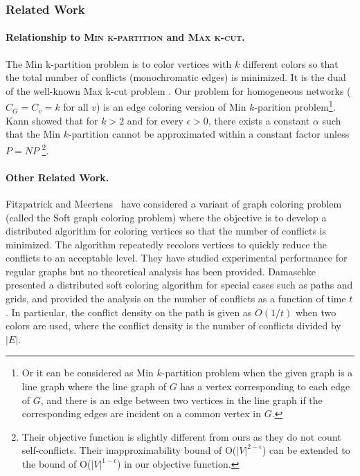 \documentclass[titlepage, 11pt]{article}
\begin{document}
\subsubsection{Related Work} 
\paragraph{Relationship to \textsc{Min k-partition} and \textsc{Max k-cut}.} 
The {\sc Min k-partition} problem is 
to color vertices with $k$ different colors
so that the total number of conflicts (monochromatic edges) is minimized.
It is the dual of the well-known {\sc Max k-cut} problem \cite{kann:istcs}.
Our problem for homogeneous networks ($C_G = C_v = k$ for all $v$) 
is an edge coloring version of {\sc Min $k$-parition} problem\footnote{
Or it can be considered as {\sc Min $k$-partition} problem  
when the given graph is a line graph where 
the line graph of $G$ has a vertex corresponding to
each edge of $G$, and there is an edge between two vertices
in the line graph if the corresponding edges
are incident on a common vertex in $G$.}.
Kann \cite{kann:istcs} showed that for $k > 2$ and for every $\epsilon > 0$,
there exists a constant $\alpha$ such that the {\sc Min $k$-partition} 
cannot be approximated within a constant factor
unless $P = NP$
\footnote{Their objective function is
slightly different from ours as they do not count self-conflicts. Their inapproximability bound 
of O($|V|^{2 - \epsilon}$) can be extended to the bound of O($|V|^{1-\epsilon}$) in our objective function.}. 


\paragraph{Other Related Work.}
Fitzpatrick and Meertens~\cite{softexp} have considered a variant of 
graph coloring problem (called the {\sc Soft graph coloring} problem)
where the objective is to develop a distributed  algorithm for coloring
vertices so that the number of conflicts is minimized.
The algorithm repeatedly recolors vertices to quickly reduce 
the conflicts to an acceptable level.
They have studied experimental performance for regular graphs 
but no theoretical analysis has been provided.   
Damaschke~\cite{softpath} presented a distributed soft coloring algorithm
for special cases such as paths and grids, 
and provided the analysis on the number of conflicts as a function of time $t$. 
In particular, the conflict density on the path is given as $O(1/t)$ 
when two colors are used,
where the conflict density is the number of conflicts divided by $|E|$.
\end{document}
